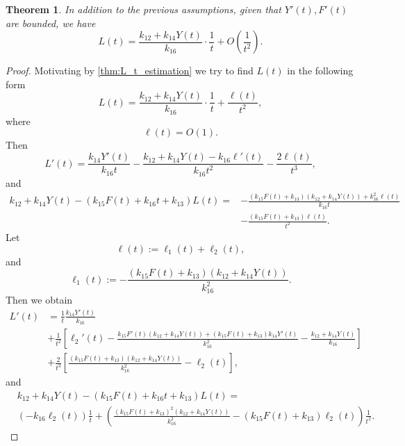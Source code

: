 \documentclass[pdflatex,sn-mathphys-num]{sn-jnl}
\theoremstyle{thmstyleone}
\newtheorem{theorem}{Theorem}[section]
\theoremstyle{thmstyletwo}
\theoremstyle{thmstylethree}
\begin{document}
\begin{theorem}\label{thm:L asymp}
In addition to the previous assumptions, given that $Y'(t), F'(t)$ are bounded, 
we have 
\begin{equation*} 
    L(t)=\frac{k_{12}+k_{14}Y(t)}{k_{16}}\cdot\frac{1}{t}+O\left( \frac{1}{t^2} \right).
\end{equation*}
\end{theorem}
\begin{proof}
Motivating by \autoref{thm:L_t_estimation} we try to find $L(t)$ in the following 
form 
\begin{equation}
L(t)=\frac{k_{12}+k_{14}Y(t)}{k_{16}}\cdot\frac{1}{t}+\frac{\ell(t)}{t^2},
\end{equation}
where 
\begin{equation*}
\ell(t)=O(1).
\end{equation*}
Then
\begin{equation}\label{eq:L_diff_lhs}
L'(t)=\frac{k_{14}Y'(t)}{k_{16}t}-\frac{k_{12}+k_{14}Y(t)-k_{16}\ell'(t)}{k_{16}t^2}
-\frac{2\ell(t)}{t^3},
\end{equation}
and
\begin{align}\label{eq:L_diff_rhs}
k_{12}+k_{14}Y(t)-(k_{15}F(t)+k_{16}t+k_{13})L(t) =
&-\frac{(k_{15}F(t)+k_{13})(k_{12}+k_{14}Y(t))+k_{16}^2\ell(t)}{k_{16}t} 
\nonumber \\
&-\frac{(k_{15}F(t)+k_{13})\ell(t)}{t^2}.
\end{align}
Let
\begin{equation*}
\ell(t):=\ell_1(t)+\ell_2(t),
\end{equation*}
and
\begin{equation}
\ell_1(t):=-\frac{(k_{15}F(t)+k_{13})(k_{12}+k_{14}Y(t))}{k_{16}^2}. 
\end{equation}
Then we obtain
\begin{align}\label{eq:L prime long}
L'(t) &=
\frac{1}{t}\frac{k_{14}Y'(t)}{k_{16}} \nonumber
\\
&+\frac{1}{t^2}\left[ \ell_2'(t)
-\frac{
k_{15}F'(t)(k_{12}+k_{14}Y(t))
+(k_{15}F(t)+k_{13})k_{14}Y'(t)
}{k_{16}^2}
-\frac{k_{12}+k_{14}Y(t)}{k_{16}}
\right] \nonumber
\\
&+\frac{2}{t^3}\left[
\frac{(k_{15}F(t)+k_{13})(k_{12}+k_{14}Y(t))}{k_{16}^2}-\ell_2(t)
\right],
\end{align}
and
\begin{align}\label{eq:L prime rhs}
&k_{12}+k_{14}Y(t)-(k_{15}F(t)+k_{16}t+k_{13})L(t) = \nonumber\\
&\left( -k_{16}\ell_2(t) \right) \frac{1}{t} + \left( \frac{(k_{15}F(t)+k_{13})^2 (k_{12}+k_{14}Y(t))}{k_{16}^2} - (k_{15}F(t)+k_{13})\ell_2(t) \right) \frac{1}{t^2}.
\end{align}


\end{proof}
\end{document}
